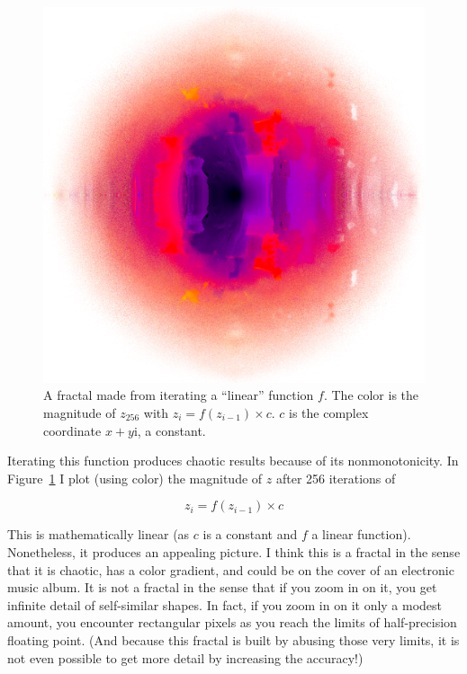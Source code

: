 \documentclass[twocolumn]{article}
\begin{document}
\begin{figure}[htp]
  \begin{center}
    \includegraphics[width=0.95 \linewidth]{perm16frac}
  \end{center}
  \caption{
    A fractal made from iterating a ``linear'' function $f$. The color
    is the magnitude of $z_{256}$ with $z_i = f(z_{i-1}) \times c$.
    $c$ is the complex coordinate $x + y\mathrm{i}$, a constant.
  } \label{fig:perm16frac}
\end{figure}

Iterating this function produces chaotic results because of its
nonmonotonicity. In Figure~\ref{fig:perm16frac} I plot (using color)
the magnitude of $z$ after 256 iterations of

$$z_i = f(z_{i-1}) \times c$$

This is mathematically linear (as $c$ is a constant and $f$ a linear
function). Nonetheless, it produces an appealing picture. I think this
is a fractal in the sense that it is chaotic, has a color gradient,
and could be on the cover of an electronic music album. It is not a
fractal in the sense that if you zoom in on it, you get infinite
detail of self-similar shapes. In fact, if you zoom in on it only a
modest amount, you encounter rectangular pixels as you reach the
limits of half-precision floating point. (And because this fractal is
built by abusing those very limits, it is not even possible to get
more detail by increasing the accuracy!)
\end{document}
